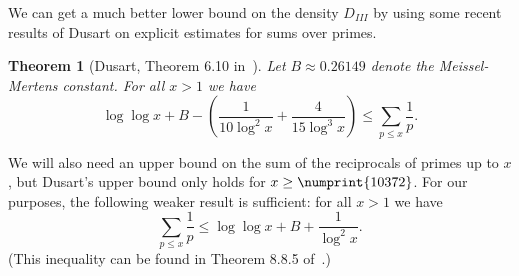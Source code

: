 \documentclass[11pt]{article}
\theoremstyle{plain}
\newtheorem{theorem}{Theorem}[section]
\theoremstyle{definition}
\theoremstyle{remark}
\numberwithin{equation}{section}
\begin{document}
We can get a much better lower bound on the density $D_{III}$ by using some
recent results of Dusart on explicit estimates for sums over primes.

\begin{theorem}[Dusart, Theorem 6.10 in~\cite{Dusart}]
  Let $B\approx 0.26149$ denote the Meissel-Mertens constant.  For
  all $x>1$ we have
  \begin{equation}\label{eq:rec_lower}
    \log\log x+B-\left(\frac{1}{10\log^2 x}+\frac{4}{15\log^3 x}\right)\leq
    \sum_{p\leq x}\frac{1}{p}.
  \end{equation}
\end{theorem}

We will also need an upper bound on the sum of the reciprocals of primes up to
$x$, but Dusart's upper bound only holds for $x\geq\numprint{10372}$.  For our
purposes, the following weaker result is sufficient: for all $x>1$ we have
\begin{equation}\label{eq:rec_upper}
  \sum_{p\leq x}\frac{1}{p}\leq\log\log x + B +\frac{1}{\log^2 x}.
\end{equation}
(This inequality can be found in Theorem 8.8.5 of~\cite{BachShallit}.)
\end{document}
